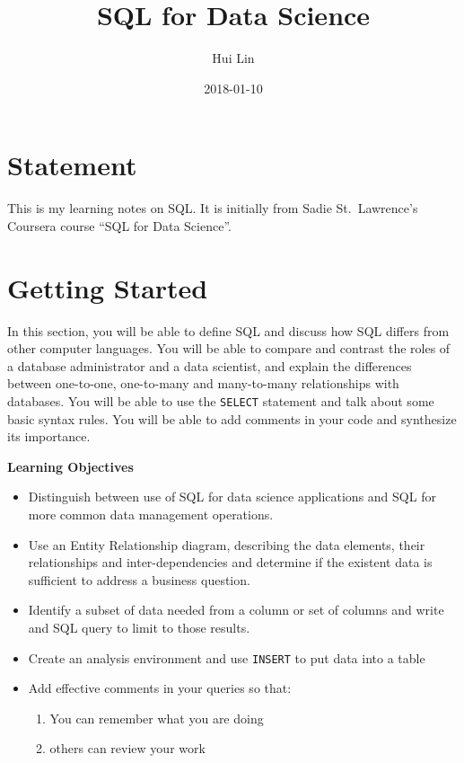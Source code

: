\documentclass[]{book}
\title{SQL for Data Science}
\author{Hui Lin}
\date{2018-01-10}
\providecommand{\tightlist}{%
  \setlength{\itemsep}{0pt}\setlength{\parskip}{0pt}}
\theoremstyle{definition}
\theoremstyle{definition}
\theoremstyle{remark}
\begin{document}
\maketitle

\thispagestyle{empty}
\begin{center}
\end{center}

\setlength{\abovedisplayskip}{-5pt}
\setlength{\abovedisplayshortskip}{-5pt}

{
\setcounter{tocdepth}{2}
\tableofcontents
}
\chapter*{Statement}\label{statement}


This is my learning notes on SQL. It is initially from Sadie
St.~Lawrence's Coursera course ``SQL for Data Science''.

\mainmatter

\chapter{Getting Started}\label{getting-started}

In this section, you will be able to define SQL and discuss how SQL
differs from other computer languages. You will be able to compare and
contrast the roles of a database administrator and a data scientist, and
explain the differences between one-to-one, one-to-many and many-to-many
relationships with databases. You will be able to use the
\texttt{SELECT} statement and talk about some basic syntax rules. You
will be able to add comments in your code and synthesize its importance.

\textbf{Learning Objectives}

\begin{itemize}
\tightlist
\item
  Distinguish between use of SQL for data science applications and SQL
  for more common data management operations.
\item
  Use an Entity Relationship diagram, describing the data elements,
  their relationships and inter-dependencies and determine if the
  existent data is sufficient to address a business question.
\item
  Identify a subset of data needed from a column or set of columns and
  write and SQL query to limit to those results.
\item
  Create an analysis environment and use \texttt{INSERT} to put data
  into a table
\item
  Add effective comments in your queries so that:

  \begin{enumerate}
  \def\labelenumi{\arabic{enumi}.}
  \tightlist
  \item
    You can remember what you are doing
  \item
    others can review your work
  \end{enumerate}
\end{itemize}
\end{document}

